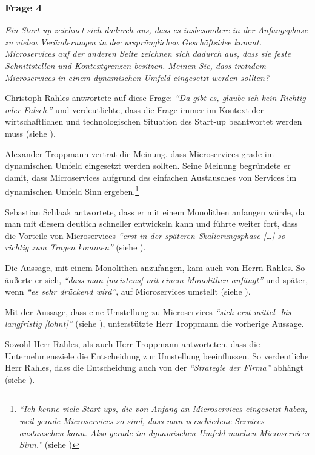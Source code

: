 \subsubsection{Frage 4}
\label{sec:frage4}

\textit{Ein Start-up zeichnet sich dadurch aus, dass es insbesondere in der Anfangsphase zu vielen Veränderungen in der ursprünglichen Geschäftsidee kommt. Microservices auf der anderen Seite zeichnen sich dadurch aus, dass sie feste Schnittstellen und Kontextgrenzen besitzen. Meinen Sie, dass trotzdem Microservices in einem dynamischen Umfeld eingesetzt werden sollten?}

Christoph Rahles antwortete auf diese Frage: \textit{\enquote{Da gibt es, glaube ich kein Richtig oder Falsch.}} und verdeutlichte, dass die Frage immer im Kontext der wirtschaftlichen und technologischen Situation des Start-up beantwortet werden muss (siehe ).

Alexander Troppmann vertrat die Meinung, dass Microservices grade im dynamischen Umfeld eingesetzt werden sollten. Seine Meinung begründete er damit, dass Microservices aufgrund des einfachen Austausches von Services im dynamischen Umfeld Sinn ergeben.\footnote{
\textit{\enquote{Ich kenne viele Start-ups, die von Anfang an Microservices eingesetzt haben, weil gerade Microservices so sind, dass man verschiedene Services austauschen kann. Also gerade im dynamischen Umfeld machen Microservices Sinn.}} (siehe )
}

Sebastian Schlaak antwortete, dass er mit einem Monolithen anfangen würde, da man mit diesem deutlich schneller entwickeln kann und führte weiter fort, dass die Vorteile von Microservices \textit{\enquote{erst in der späteren Skalierungsphase […] so richtig zum Tragen kommen}} (siehe ).

Die Aussage, mit einem Monolithen anzufangen, kam auch von Herrn Rahles. So äußerte er sich, \textit{\enquote{dass man [meistens] mit einem Monolithen anfängt}} und später, wenn \textit{\enquote{es sehr drückend wird}}, auf Microservices umstellt (siehe ).

Mit der Aussage, dass eine Umstellung zu Microservices \textit{\enquote{sich erst mittel- bis langfristig [lohnt]}} (siehe ), unterstützte Herr Troppmann die vorherige Aussage.

Sowohl Herr Rahles, als auch Herr Troppmann antworteten, dass die Unternehmensziele die Entscheidung zur Umstellung beeinflussen. So verdeutliche Herr Rahles, dass die Entscheidung auch von der \textit{\enquote{Strategie der Firma}} abhängt (siehe ).

